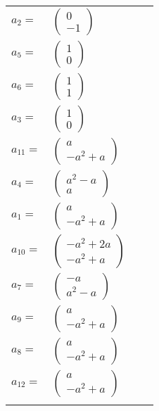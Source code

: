 \documentclass[1p]{elsarticle_modified}
\theoremstyle{definition}
\begin{document}
\begin{tabular}{m{7pt} m{180pt} m{7pt} m{180pt} }
\flushright $a_{2}=$&$\begin{pmatrix}0\\-1\end{pmatrix}$ \\
\flushright $a_{5}=$&$\begin{pmatrix}1\\0\end{pmatrix}$ \\
\flushright $a_{6}=$&$\begin{pmatrix}1\\1\end{pmatrix}$ \\
\flushright $a_{3}=$&$\begin{pmatrix}1\\0\end{pmatrix}$ \\
\flushright $a_{11}=$&$\begin{pmatrix}a\\- a^2+a\end{pmatrix}$ \\
\flushright $a_{4}=$&$\begin{pmatrix}a^2- a\\a\end{pmatrix}$ \\
\flushright $a_{1}=$&$\begin{pmatrix}a\\- a^2+a\end{pmatrix}$ \\
\flushright $a_{10}=$&$\begin{pmatrix}- a^2+2 a\\- a^2+a\end{pmatrix}$ \\
\flushright $a_{7}=$&$\begin{pmatrix}- a\\a^2- a\end{pmatrix}$ \\
\flushright $a_{9}=$&$\begin{pmatrix}a\\- a^2+a\end{pmatrix}$ \\
\flushright $a_{8}=$&$\begin{pmatrix}a\\- a^2+a\end{pmatrix}$ \\
\flushright $a_{12}=$&$\begin{pmatrix}a\\- a^2+a\end{pmatrix}$\\&\end{tabular}
\end{document}
